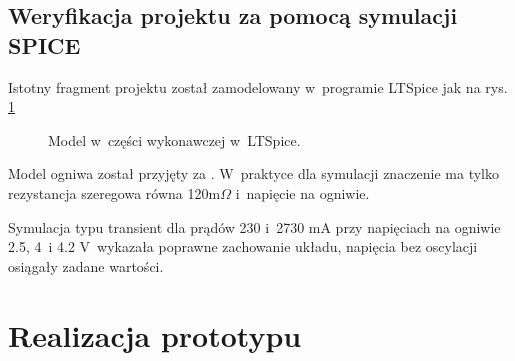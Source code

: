 \documentclass[polish,engineer]{polsl-msth}
\begin{document}
\section{Weryfikacja projektu za pomocą symulacji SPICE}
Istotny fragment projektu został zamodelowany w~programie LTSpice jak na rys. \ref{img:modelLTv1}
\begin{figure}[hbtp]
\centering
     \caption{Model w~części wykonawczej w~LTSpice. \label{img:modelLTv1}}
\end{figure}
Model ogniwa został przyjęty za \cite{8759769_cellmodel1storder}. W~praktyce dla symulacji znaczenie ma tylko rezystancja szeregowa równa 120m$\Omega$ i~napięcie na ogniwie.

Symulacja typu transient dla prądów 230 i~2730 mA przy napięciach na ogniwie 2.5, 4~i 4.2 V~wykazała poprawne zachowanie układu, napięcia bez oscylacji osiągały zadane wartości.

\chapter{Realizacja prototypu}
\end{document}
